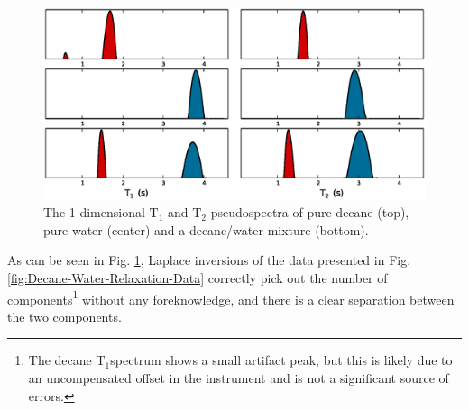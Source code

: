 \documentclass[PaulGanssle-Thesis.tex]{subfiles}
\begin{document}
\begin{figure}[t]
\centering
    \includegraphics[width=\textwidth]{figures/relaxometry/decane-water-t1-t2-1d.eps}
    \caption{The 1-dimensional $\mathrm{T}_{1}$ and $\mathrm{T}_{2}$ pseudospectra of pure decane (top), pure water (center) and a decane/water mixture (bottom).}
    \label{fig:DecaneWater-1D-Data}
\end{figure}

As can be seen in Fig. \ref{fig:DecaneWater-1D-Data}, Laplace inversions of the data presented in Fig. \ref{fig:Decane-Water-Relaxation-Data} correctly pick out the number of components\footnote{The decane $\mathrm{T}_{1}$spectrum shows a small artifact peak, but this is likely due to an uncompensated offset in the instrument and is not a significant source of errors.} without any foreknowledge, and there is a clear separation between the two components.\cite{Song2007}
\end{document}
